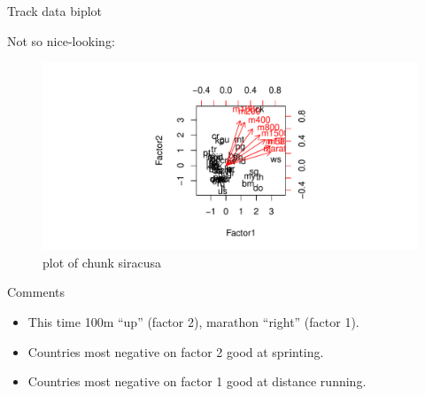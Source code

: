 \documentclass[ignorenonframetext,]{beamer}
\newenvironment{Shaded}{\begin{snugshade}}{\end{snugshade}}
\newcommand{\DataTypeTok}[1]{\textcolor[rgb]{0.13,0.29,0.53}{#1}}
\newcommand{\KeywordTok}[1]{\textcolor[rgb]{0.13,0.29,0.53}{\textbf{#1}}}
\newcommand{\NormalTok}[1]{#1}
\newcommand{\OperatorTok}[1]{\textcolor[rgb]{0.81,0.36,0.00}{\textbf{#1}}}
\begin{document}
\begin{frame}[fragile]{Track data biplot}
\protect\hypertarget{track-data-biplot}{}

Not so nice-looking:

\begin{Shaded}
\end{Shaded}

\begin{figure}
\centering
\includegraphics{figure/siracusa-1.pdf}
\caption{plot of chunk siracusa}
\end{figure}

\end{frame}

\begin{frame}{Comments}
\protect\hypertarget{comments-38}{}

\begin{itemize}
\item
  This time 100m ``up'' (factor 2), marathon ``right'' (factor 1).
\item
  Countries most negative on factor 2 good at sprinting.
\item
  Countries most negative on factor 1 good at distance running.
\end{itemize}

\end{frame}
\end{document}

